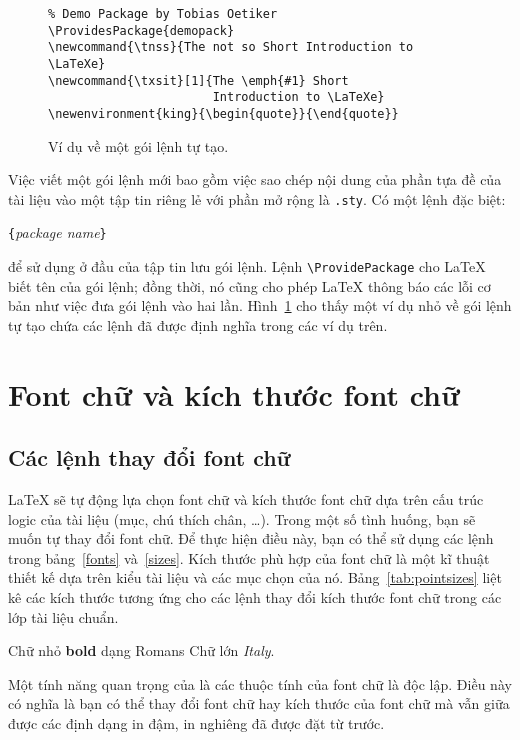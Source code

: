 \begin{figure}[!htbp]
\begin{lined}{\textwidth}
\begin{verbatim}
% Demo Package by Tobias Oetiker
\ProvidesPackage{demopack}
\newcommand{\tnss}{The not so Short Introduction to \LaTeXe}
\newcommand{\txsit}[1]{The \emph{#1} Short
                       Introduction to \LaTeXe}
\newenvironment{king}{\begin{quote}}{\end{quote}}
\end{verbatim}
\end{lined}
\caption{Ví dụ về một gói lệnh tự tạo.} \label{package}
\end{figure}
Việc viết một gói lệnh mới bao gồm việc sao chép nội dung của phần tựa đề của tài liệu vào một tập tin riêng lẻ với phần mở rộng là \texttt{.sty}. Có một lệnh đặc biệt:
\begin{lscommand}
\verb|{|\emph{package name}\verb|}|
\end{lscommand}
\noindent để sử dụng ở đầu của tập tin lưu gói lệnh. Lệnh \verb|\ProvidePackage| cho \LaTeX{} biết tên của gói lệnh; đồng
thời, nó cũng cho phép \LaTeX{} thông báo các lỗi cơ bản như việc đưa gói lệnh vào hai lần. Hình~\ref{package} cho thấy một ví dụ nhỏ về gói lệnh tự tạo chứa các lệnh đã được định nghĩa trong các ví dụ trên.

\section{Font chữ và kích thước font chữ}

\subsection{Các lệnh thay đổi font chữ}
 \LaTeX{} sẽ tự động lựa chọn font chữ và kích thước font chữ dựa trên cấu trúc logic của tài liệu (mục, chú thích chân, \ldots). Trong một số tình huống, bạn sẽ muốn tự thay đổi font chữ. Để thực hiện điều này, bạn có thể sử dụng các lệnh trong bảng~\ref{fonts} và~\ref{sizes}. Kích thước phù hợp của font chữ là một kĩ thuật thiết kế dựa trên kiểu tài liệu và các mục chọn của nó. Bảng~\ref{tab:pointsizes} liệt kê các kích thước tương ứng cho các lệnh thay đổi kích thước font chữ trong các lớp tài liệu chuẩn.

\begin{example}
{\small Chữ nhỏ \textbf{bold}
dạng Romans} {\Large Chữ lớn
\textit{Italy}.}
\end{example}
Một tính năng quan trọng của \LaTeXe{} là các thuộc tính của font chữ là độc lập. Điều này có nghĩa là bạn có thể thay đổi  font chữ hay kích thước của font chữ mà vẫn giữa được các định dạng in đậm, in nghiêng đã được đặt từ trước.


